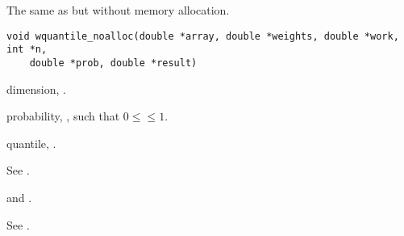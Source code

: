 \documentclass[a4paper,oneside,10pt,DIV=12]{scrreprt}
\begin{document}
\begin{Description}
The same as  but without memory allocation.
\end{Description}
\begin{Usage}
\begin{verbatim}
void wquantile_noalloc(double *array, double *weights, double *work, int *n,
    double *prob, double *result)
\end{verbatim}
\end{Usage}
\begin{Arguments}
	\begin{ldescription}
		\item[\code{n}] dimension, . 
		\item[\code{prob}] probability, , such that 
			$0 \leq$$\leq 1$. 
		\item[\code{result}] quantile, . 
	\end{ldescription}
\end{Arguments}
\begin{Details}
	See .
\end{Details}
\begin{Dependencies}
	 and .
\end{Dependencies}
\begin{Value}
See .
\end{Value}
\end{document}
